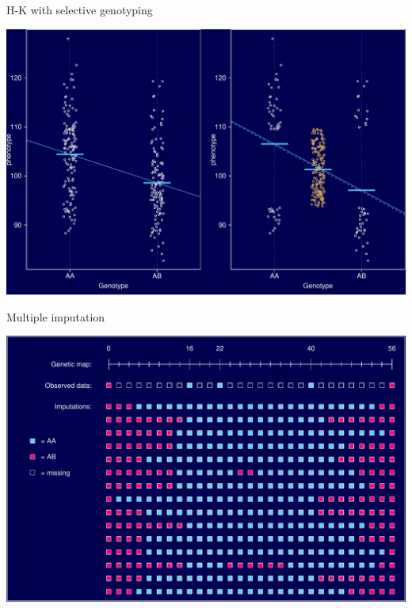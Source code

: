\documentclass[12pt]{article}
\newcommand{\headsize}{\fontsize{35}{35} \selectfont}
\begin{document}
\newpage

\headsize \color{myyellow}
\hfill \begin{minipage}{5.75in}
\centering
H-K with selective genotyping
\end{minipage}

\vfill

\centerline{\includegraphics{FigsA/hk_selgeno.pdf}}





\newpage

\headsize \color{myyellow}
\hfill \begin{minipage}{5.75in}
\centering
Multiple imputation
\end{minipage}

\vfill

\centerline{\includegraphics{FigsA/imp.pdf}}


\newpage
\end{document}
